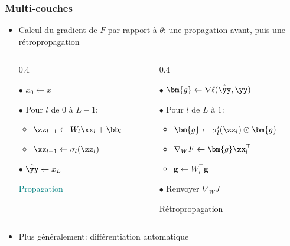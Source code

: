 \documentclass[9pt,table]{beamer} %
\begin{document}
\begin{frame}
\frametitle{Multi-couches}


\begin{itemize}[label=\tiny$\blacksquare$]
	\item Calcul du gradient de $F$ par rapport à $\theta$: une propagation avant, puis une rétropropagation

	\begin{columns}[t]
	\begin{column}{0.4\textwidth}
	\centering
	\begin{tcolorbox}[colback=teal!20,width=0.8\textwidth]
	$\bullet$ $x_0 \leftarrow  x$
	
	$\bullet$ Pour $l$ de $0$ à $L-1$:
	\begin{itemize}[label=-]
		\item $\zz_{l+1} \leftarrow W_{l}\xx_{l} + \bb_{l}$
		\item $\xx_{l+1} \leftarrow \sigma_{l}(\zz_l)$
	\end{itemize}
	$\bullet$ $\hat{\yy} \leftarrow x_{L}$
	\end{tcolorbox}
	\textcolor{teal}{Propagation}
	
	\end{column}
	\begin{column}{0.4\textwidth}
	\centering
	\begin{tcolorbox}[colback=mLightBrown!20,width=0.9\textwidth]
	$\bullet$ $\bm{g} \leftarrow  \nabla \ell(\hat{\yy},\yy)$
	
	$\bullet$ Pour $l$ de $L$ à $1$:
	\begin{itemize}[label=-]
		\item $\bm{g} \leftarrow \sigma_l'(\zz_{l}) \odot \bm{g}$
		\item ${\nabla_{W} F} \leftarrow \bm{g}\xx_l^\top$
		\item $\bm{g} \leftarrow W_l^\top \bm{g}$
	\end{itemize}
	$\bullet$ Renvoyer ${\nabla_W J}$
	\end{tcolorbox}
	\textcolor{mLightBrown}{Rétropropagation}
	\end{column}
	\end{columns}
	
	
	\item Plus généralement: \alert{différentiation automatique}
\end{itemize}


\end{frame}
\end{document}
